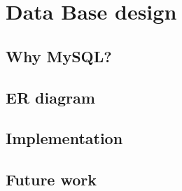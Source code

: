 %
\section{Data Base design}

\subsection{Why MySQL?}

\subsection{ER diagram}

\subsection{Implementation}

\subsection{Future work}